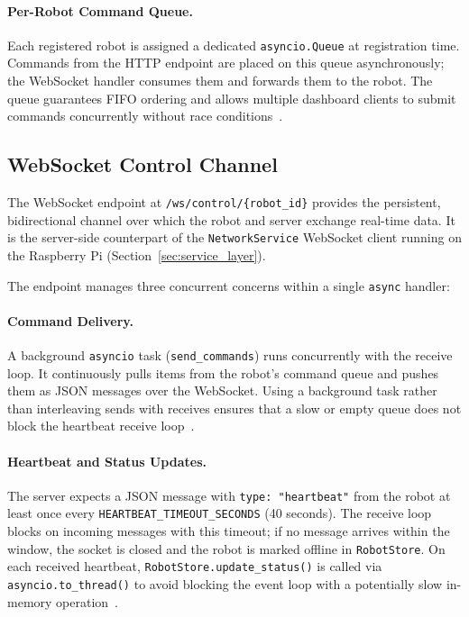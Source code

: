 \paragraph{Per-Robot Command Queue.}
Each registered robot is assigned a dedicated \texttt{asyncio.Queue}
at registration time. Commands from the HTTP endpoint are placed on
this queue asynchronously; the WebSocket handler consumes them and
forwards them to the robot. The queue guarantees FIFO ordering and
allows multiple dashboard clients to submit commands concurrently
without race conditions~\cite{tanenbaum2021networks}.

\subsection{WebSocket Control Channel}
\label{sec:server_ws}

The WebSocket endpoint at \texttt{/ws/control/\{robot\_id\}} provides
the persistent, bidirectional channel over which the robot and server
exchange real-time data. It is the server-side counterpart of the
\texttt{NetworkService} WebSocket client running on the Raspberry Pi
(Section~\ref{sec:service_layer}).

The endpoint manages three concurrent concerns within a single
\texttt{async} handler:

\paragraph{Command Delivery.}
A background \texttt{asyncio} task (\texttt{send\_commands}) runs
concurrently with the receive loop. It continuously pulls items from
the robot's command queue and pushes them as JSON messages over the
WebSocket. Using a background task rather than interleaving sends with
receives ensures that a slow or empty queue does not block the
heartbeat receive loop~\cite{fastapi2024}.

\paragraph{Heartbeat and Status Updates.}
The server expects a JSON message with \texttt{type: "heartbeat"}
from the robot at least once every \texttt{HEARTBEAT\_TIMEOUT\_SECONDS}
(40 seconds). The receive loop blocks on incoming messages with this
timeout; if no message arrives within the window, the socket is
closed and the robot is marked offline in \texttt{RobotStore}. On
each received heartbeat, \texttt{RobotStore.update\_status()} is
called via \texttt{asyncio.to\_thread()} to avoid blocking the
event loop with a potentially slow in-memory
operation~\cite{fastapi2024}.

